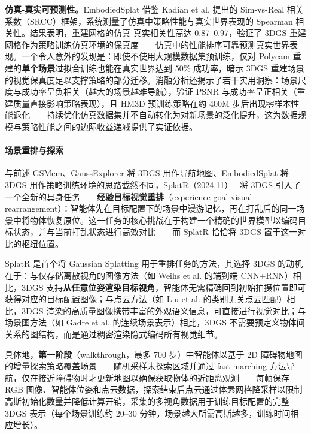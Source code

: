 \textbf{仿真-真实可预测性。}EmbodiedSplat 借鉴 Kadian et al. 提出的 Sim-vs-Real 相关系数（SRCC）框架，系统测量了仿真中策略性能与真实世界表现的 Spearman 相关性。结果表明，重建网格的仿真-真实相关性高达 0.87--0.97，验证了 3DGS 重建网格作为策略训练仿真环境的保真度——仿真中的性能排序可靠预测真实世界表现。一个令人意外的发现是：即使不使用大规模数据集预训练，仅对 Polycam 重建的\textbf{单个场景}过拟合训练也能在真实世界达到 50\% 成功率，暗示 3DGS 重建场景的视觉保真度足以支撑策略的部分迁移。消融分析还揭示了若干实用洞察：场景尺度与成功率呈负相关（越大的场景越难导航），验证 PSNR 与成功率呈正相关（重建质量直接影响策略表现），且 HM3D 预训练策略在约 400M 步后出现零样本性能退化——持续优化仿真数据集并不自动转化为对新场景的泛化提升，这为数据规模与策略性能之间的边际收益递减提供了实证依据。

\paragraph{场景重排与探索}

与前述 GSMem、GaussExplorer 将 3DGS 用作导航地图、EmbodiedSplat 将 3DGS 用作策略训练环境的思路截然不同，SplatR（2024.11）~\cite{2411_14322} 将 3DGS 引入了一个全新的具身任务——\textbf{经验目标视觉重排}（experience goal visual rearrangement）：智能体先在目标配置下的场景中漫游记忆，再在打乱后的同一场景中将物体恢复原位。这一任务的核心挑战在于构建一个精确的世界模型以编码目标状态，并与当前打乱状态进行高效对比——而 SplatR 恰恰将 3DGS 置于这一对比的枢纽位置。

SplatR 是首个将 Gaussian Splatting 用于重排任务的方法，其选择 3DGS 的动机在于：与仅存储离散视角的图像方法（如 Weihs et al. 的端到端 CNN+RNN）相比，3DGS 支持\textbf{从任意位姿渲染目标视角}，智能体无需精确回到初始拍摄位置即可获得对应的目标配置图像；与点云方法（如 Liu et al. 的类别无关点云匹配）相比，3DGS 渲染的高质量图像携带丰富的外观语义信息，可直接进行视觉对比；与场景图方法（如 Gadre et al. 的连续场景表示）相比，3DGS 不需要预定义物体间关系的图结构，而是通过稠密渲染隐式编码所有视觉细节。

具体地，\textbf{第一阶段}（walkthrough，最多 700 步）中智能体以基于 2D 障碍物地图的增量探索策略覆盖场景——随机采样未探索区域并通过 fast-marching 方法导航，仅在接近障碍物时才更新地图以确保获取物体的近距离观测——每帧保存 RGB 图像、智能体位姿和点云数据，探索结束后点云通过体素网格降采样以限制高斯初始化数量并降低计算开销，采集的多视角数据用于训练目标配置的完整 3DGS 表示（每个场景训练约 20--30 分钟，场景越大所需高斯越多，训练时间相应增长）。

